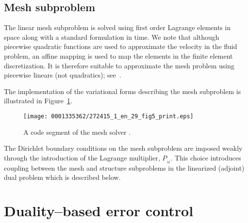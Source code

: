 \subsection{Mesh subproblem}

The linear mesh subproblem is solved using first order Lagrange
elements in space along with a standard \cgone{} formulation in time. We
note that although piecewise quadratic functions are used to
approximate the velocity in the fluid problem, an affine mapping is
used to map the elements in the finite element discretization. It is
therefore suitable to approximate the mesh problem using piecewise
linears (not quadratics); see~\citet{FormaggiaNobile1999}.

The implementation of the variational forms describing the mesh
subproblem is illustrated in Figure~\ref{selim:fig:meshsolver}.
\begin{figure}[!t]
\texttt{[image: 0001335362/272415\_1\_en\_29\_fig5\_print.eps]}
\caption{A code segment of the mesh solver .}
\label{selim:fig:meshsolver}
\end{figure}
The Dirichlet boundary conditions on the mesh subproblem are imposed
weakly through the introduction of the Lagrange multiplier,
$P_{_{M}}$. This choice introduces coupling between the mesh and
structure subproblems in the linearized (adjoint) dual problem which
is described below.

\section{Duality--based error control}

